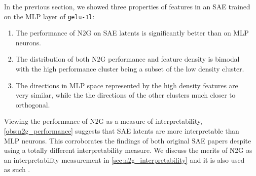 In the previous section, we showed three properties of features in an \ac{SAE} trained on the \ac{MLP} layer of \texttt{gelu-1l}: 
\begin{enumerate}[ref={observation~\arabic*}]
    \item The performance of \ac{N2G} on \ac{SAE} latents is significantly better than on \ac{MLP} neurons.\label{obs:n2g_performance}
    \item The distribution of both \ac{N2G} performance and feature density is bimodal with the high performance cluster being a subset of the low density cluster.\label{obs:bimodal}
    \item The directions in \ac{MLP} space represented by the high density features are very similar, while the the directions of the other clusters much closer to orthogonal.\label{obs:directions}
\end{enumerate}
Viewing the performance of \ac{N2G} as a measure of interpretability, \ref{obs:n2g_performance} suggests that \ac{SAE} latents are more interpretable than \ac{MLP} neurons.
This corroborates the findings of both original \ac{SAE} papers \parencite{bricken_towards_2023}\parencite{cunningham_sparse_2023} despite using a totally different interpretability measure.
We discuss the merits of \ac{N2G} as an interpretability measurement in \autoref{sec:n2g_interpretability} and it is also used as such \textcite{gao_scaling_2024}.

